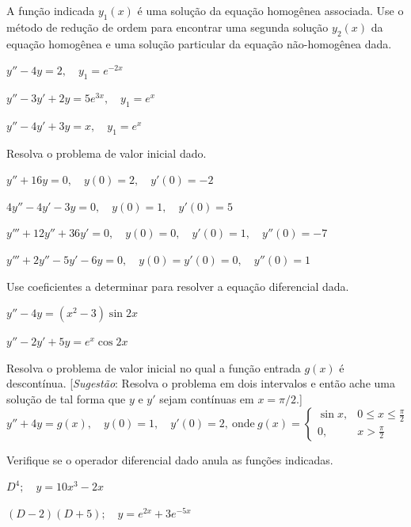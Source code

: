 \documentclass[oneside,12pt,a4paper]{report}
\begin{document}
 A função indicada $y_1(x)$ é uma solução da equação homogênea associada. Use o método de redução de ordem para encontrar uma segunda solução $y_2(x)$ da equação homogênea e uma solução particular da equação não-homogênea dada.
\begin{itensquestao}
    \item $y''-4y=2,\quad y_1=e^{-2x}$
    \item $y''-3y'+2y=5e^{3x},\quad y_1=e^{x}$
    \item $y''-4y'+3y=x,\quad y_1=e^{x}$
\end{itensquestao}

 Resolva o problema de valor inicial dado.
\begin{itensquestao}
    \item $y'' + 16y = 0, \quad y(0) = 2, \quad y'(0) = -2$
    \item $4y'' - 4y' - 3y = 0, \quad y(0) = 1, \quad y'(0) = 5$
    \item $y''' + 12y'' + 36y' = 0, \quad y(0) = 0, \quad y'(0) = 1, \quad y''(0) = -7$
    \item $y''' + 2y'' - 5y' - 6y = 0, \quad y(0) = y'(0) = 0, \quad y''(0) = 1$
\end{itensquestao}

 Use coeficientes a determinar para resolver a equação diferencial dada.
\begin{itensquestao}[2]
    \item $y'' - 4y = (x^2 - 3) \sin 2x$
    \item $y'' - 2y' + 5y = e^x \cos 2x$
\end{itensquestao}

 Resolva o problema de valor inicial no qual a função entrada $g(x)$ é descontínua. [\textit{Sugestão}: Resolva o problema em dois intervalos e então ache uma solução de tal forma que $y$ e $y'$ sejam contínuas em $x = \pi/2$.]
$$y'' + 4y = g(x), \quad y(0) = 1, \quad y'(0) = 2,~\text{onde}~g(x) = \begin{cases} \sin x, & 0 \leq x \leq \frac{\pi}{2} \\ 0, & x > \frac{\pi}{2} \end{cases}$$

 Verifique se o operador diferencial dado anula as funções indicadas.
\begin{itensquestao}[2]
    \item $D^4; \quad y = 10x^3 - 2x$
    \item $(D - 2)(D + 5); \quad y = e^{2x} + 3e^{-5x}$
\end{itensquestao}
\end{document}
